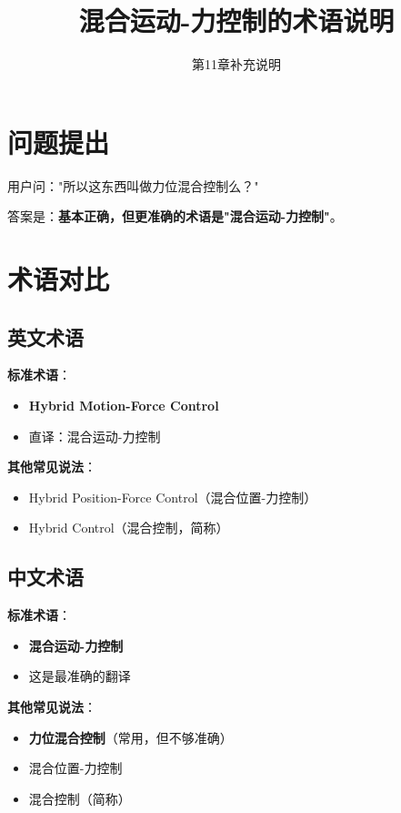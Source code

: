 \documentclass[12pt,a4paper]{article}
\title{混合运动-力控制的术语说明}
\author{第11章补充说明}
\date{}
\begin{document}
\maketitle

\section{问题提出}

用户问："所以这东西叫做力位混合控制么？"

答案是：\textbf{基本正确，但更准确的术语是"混合运动-力控制"}。

\section{术语对比}

\subsection{英文术语}

\textbf{标准术语}：
\begin{itemize}
\item \textbf{Hybrid Motion-Force Control}
\item 直译：混合运动-力控制
\end{itemize}

\textbf{其他常见说法}：
\begin{itemize}
\item Hybrid Position-Force Control（混合位置-力控制）
\item Hybrid Control（混合控制，简称）
\end{itemize}

\subsection{中文术语}

\textbf{标准术语}：
\begin{itemize}
\item \textbf{混合运动-力控制}
\item 这是最准确的翻译
\end{itemize}

\textbf{其他常见说法}：
\begin{itemize}
\item \textbf{力位混合控制}（常用，但不够准确）
\item 混合位置-力控制
\item 混合控制（简称）
\end{itemize}
\end{document}
